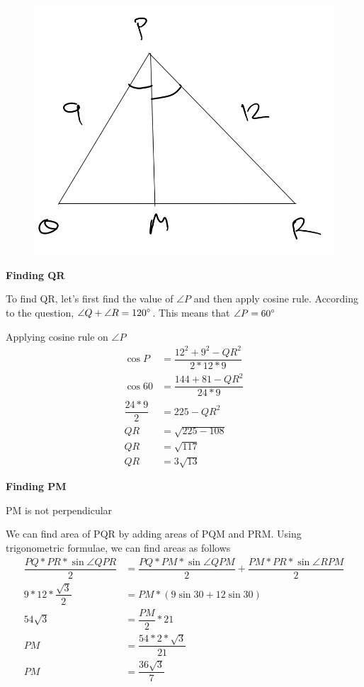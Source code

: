 \newpage


\begin{figure}[h!]
    \centering
    \includegraphics[width=0.35\linewidth]{./Quant/Geometry/Images/Triangles/triangle_10_question_1_img.png}
\end{figure}

\textbf{Finding QR}

To find QR, let's first find the value of $\angle{P}$ and then apply cosine rule. According to the question, $\angle{Q} + \angle{R} = {120}^{\circ}$. This means that $\angle{P} = {60}^{\circ}$

Applying cosine rule on $\angle{P}$
\begin{align*}
    \cos{P} &= \dfrac{12^2 + 9^2 - QR^2}{2 * 12 * 9} \\
    \cos{60} &= \dfrac{144 + 81 - QR^2}{24 * 9} \\
    \dfrac{24 * 9}{2} &= 225 - QR^2 \\
    QR &= \sqrt{225 - 108} \\
    QR &= \sqrt{117} \\
    QR &= 3 \sqrt{13}
\end{align*}

\textbf{Finding PM}
\begin{WARNING}
    PM is not perpendicular
\end{WARNING}

We can find area of PQR by adding areas of PQM and PRM. Using trigonometric formulae, we can find areas as follows
\begin{align*}
    \dfrac{PQ * PR * \sin{\angle{QPR}}}{2} &= \dfrac{PQ * PM * \sin{\angle{QPM}}}{2} + \dfrac{PM * PR * \sin{\angle{RPM}}}{2} \\
    9 * 12 * \dfrac{\sqrt{3}}{2} &= PM * (9 \sin{30} + 12 \sin{30}) \\
    54 \sqrt{3} &= \dfrac{PM}{2} * 21 \\
    PM &= \dfrac{54 * 2 * \sqrt{3}}{21} \\
    PM &= \dfrac{36 \sqrt{3}}{7}
\end{align*}

